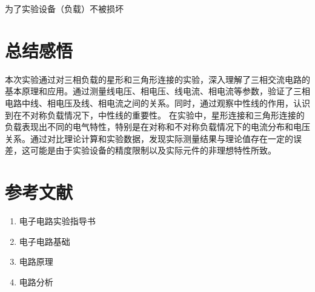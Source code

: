 \documentclass{article}
\begin{document}
为了实验设备（负载）不被损坏


\section{总结感悟 }
本次实验通过对三相负载的星形和三角形连接的实验，深入理解了三相交流电路的基本原理和应用。通过测量线电压、相电压、线电流、相电流等参数，验证了三相电路中线、相电压及线、相电流之间的关系。同时，通过观察中性线的作用，认识到在不对称负载情况下，中性线的重要性。
在实验中，星形连接和三角形连接的负载表现出不同的电气特性，特别是在对称和不对称负载情况下的电流分布和电压关系。通过对比理论计算和实验数据，发现实际测量结果与理论值存在一定的误差，这可能是由于实验设备的精度限制以及实际元件的非理想特性所致。


\section{参考文献}
\begin{enumerate}
    \item 电子电路实验指导书
    \item 电子电路基础
    \item 电路原理
    \item 电路分析
\end{enumerate} 
\end{document}
